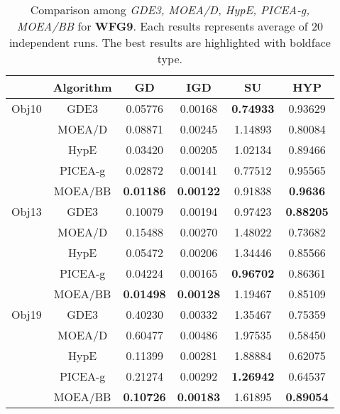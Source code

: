 \begin{center}
\begin{table}[!h]
\end{table}
\begin{table}[!h]
\caption{Comparison among \textit{GDE3, MOEA/D, HypE, PICEA-g, MOEA/BB} for \textbf{WFG9}. Each results represents average of 20 independent runs. The best results are highlighted with boldface type.}
\begin{tabular}{| c | c | c | c | c | c |}

\hline
&\textbf{Algorithm}	&\textbf{GD}&\textbf{IGD}&\textbf{SU}&\textbf{HYP}\\\hline
Obj10	&GDE3		&0.05776			&0.00168			&\textbf{0.74933}	&0.93629\\\cline{2-6}
		&MOEA/D		&0.08871			&0.00245			&1.14893			&0.80084\\\cline{2-6}
		&HypE		&0.03420			&0.00205			&1.02134			&0.89466\\\cline{2-6}
		&PICEA-g	&0.02872			&0.00141			&0.77512			&0.95565\\\cline{2-6}
		&MOEA/BB	&\textbf{0.01186}	&\textbf{0.00122}	&0.91838			&\textbf{0.9636}\\\hline
		
Obj13	&GDE3		&0.10079			&0.00194			&0.97423			&\textbf{0.88205}\\\cline{2-6}
		&MOEA/D		&0.15488			&0.00270			&1.48022			&0.73682 \\\cline{2-6}
		&HypE		&0.05472			&0.00206			&1.34446			&0.85566\\\cline{2-6}
		&PICEA-g	&0.04224			&0.00165			&\textbf{0.96702}	&0.86361\\\cline{2-6}
		&MOEA/BB	&\textbf{0.01498}	&\textbf{0.00128}	&1.19467			&0.85109\\\hline					
		
Obj19	&GDE3		&0.40230			&0.00332			&1.35467			&0.75359\\\cline{2-6}
		&MOEA/D		&0.60477			&0.00486			&1.97535			&0.58450\\\cline{2-6}
		&HypE		&0.11399			&0.00281			&1.88884			&0.62075\\\cline{2-6}
		&PICEA-g	&0.21274			&0.00292			&\textbf{1.26942}	&0.64537\\\cline{2-6}
		&MOEA/BB	&\textbf{0.10726}	&\textbf{0.00183}	&1.61895			&\textbf{0.89054}\\
\hline
\end{tabular}
\label{tab:wfg9}
\end{table}
\end{center}